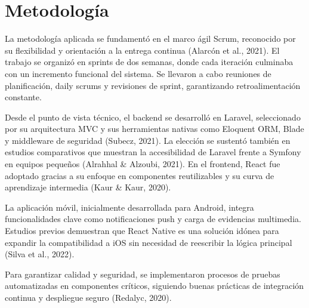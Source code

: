 \section{Metodología}
La metodología aplicada se fundamentó en el marco ágil Scrum, reconocido por su flexibilidad y orientación a la entrega continua (Alarcón et al., 2021). El trabajo se organizó en sprints de dos semanas, donde cada iteración culminaba con un incremento funcional del sistema. Se llevaron a cabo reuniones de planificación, daily scrums y revisiones de sprint, garantizando retroalimentación constante.

Desde el punto de vista técnico, el backend se desarrolló en Laravel, seleccionado por su arquitectura MVC y sus herramientas nativas como Eloquent ORM, Blade y middleware de seguridad (Subecz, 2021). La elección se sustentó también en estudios comparativos que muestran la accesibilidad de Laravel frente a Symfony en equipos pequeños (Alrahhal & Alzoubi, 2021). En el frontend, React fue adoptado gracias a su enfoque en componentes reutilizables y su curva de aprendizaje intermedia (Kaur & Kaur, 2020).

La aplicación móvil, inicialmente desarrollada para Android, integra funcionalidades clave como notificaciones push y carga de evidencias multimedia. Estudios previos demuestran que React Native es una solución idónea para expandir la compatibilidad a iOS sin necesidad de reescribir la lógica principal (Silva et al., 2022).

Para garantizar calidad y seguridad, se implementaron procesos de pruebas automatizadas en componentes críticos, siguiendo buenas prácticas de integración continua y despliegue seguro (Redalyc, 2020).